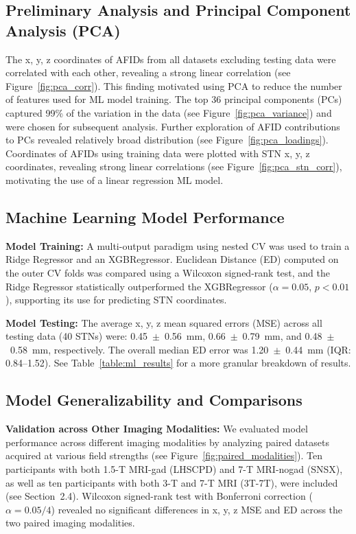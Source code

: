 \subsection{Preliminary Analysis and Principal Component Analysis (PCA)}
The x, y, z coordinates of AFIDs from all datasets excluding testing data were correlated with each other, revealing a strong linear correlation (see Figure~\ref{fig:pca_corr}). This finding motivated using PCA to reduce the number of features used for ML model training. The top 36 principal components (PCs) captured 99\% of the variation in the data (see Figure~\ref{fig:pca_variance}) and were chosen for subsequent analysis. Further exploration of AFID contributions to PCs revealed relatively broad distribution (see Figure~\ref{fig:pca_loadings}). Coordinates of AFIDs using training data were plotted with STN x, y, z coordinates, revealing strong linear correlations (see Figure~\ref{fig:pca_stn_corr}), motivating the use of a linear regression ML model.

\subsection{Machine Learning Model Performance}
\textbf{Model Training:} A multi-output paradigm using nested CV was used to train a Ridge Regressor and an XGBRegressor. Euclidean Distance (ED) computed on the outer CV folds was compared using a Wilcoxon signed-rank test, and the Ridge Regressor statistically outperformed the XGBRegressor ($\alpha = 0.05$, $p < 0.01$), supporting its use for predicting STN coordinates.

\textbf{Model Testing:} The average x, y, z mean squared errors (MSE) across all testing data (40 STNs) were: 0.45~$\pm$~0.56~mm, 0.66~$\pm$~0.79~mm, and 0.48~$\pm$~0.58~mm, respectively. The overall median ED error was 1.20~$\pm$~0.44~mm (IQR: 0.84–1.52). See Table~\ref{table:ml_results} for a more granular breakdown of results.

\subsection{Model Generalizability and Comparisons}

\textbf{Validation across Other Imaging Modalities:} We evaluated model performance across different imaging modalities by analyzing paired datasets acquired at various field strengths (see Figure~\ref{fig:paired_modalities}). Ten participants with both 1.5-T MRI-gad (LHSCPD) and 7-T MRI-nogad (SNSX), as well as ten participants with both 3-T and 7-T MRI (3T-7T), were included (see Section~2.4). Wilcoxon signed-rank test with Bonferroni correction ($\alpha = 0.05/4$) revealed no significant differences in x, y, z MSE and ED across the two paired imaging modalities.

